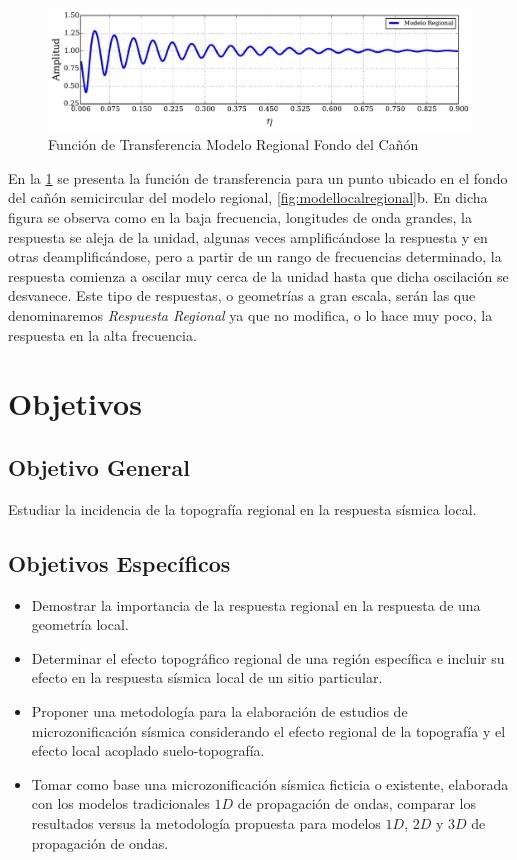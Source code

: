 \documentclass[spanish,letterpaper,12pt,twoside,openany]{article}
\begin{document}
\begin{figure}[H]
	\centering
	\includegraphics[width=15.5 cm]{img/RegionalResponse.pdf}
	\vspace{-1 cm}
	\caption{Función de Transferencia Modelo Regional Fondo del Cañón}
	\label{fig:regionalresponse}
	\vspace{-1 cm}
\end{figure}

En la \cref{fig:regionalresponse} se presenta la función de transferencia para un punto ubicado en el fondo del cañón semicircular del modelo regional, \cref{fig:modellocalregional}b. En dicha figura se observa como en la baja frecuencia, longitudes de onda grandes, la respuesta se aleja de la unidad, algunas veces amplificándose la respuesta y en otras deamplificándose, pero a partir de un rango de frecuencias determinado, la respuesta comienza a oscilar muy cerca de la unidad hasta que dicha oscilación se desvanece. Este tipo de respuestas, o geometrías a gran escala, serán las que denominaremos \textit{Respuesta Regional} ya que no modifica, o lo hace muy poco, la respuesta en la alta frecuencia.
%
%
%
%
%
\newpage
%
\section{Objetivos}
%
\subsection{Objetivo General}
%
Estudiar la incidencia de la topografía regional en la respuesta sísmica local.
%
\subsection{Objetivos Específicos}
%
\begin{itemize}
%
	\item Demostrar la importancia de la respuesta regional en la respuesta de una geometría local.
	\item Determinar el efecto topográfico regional de una región específica e incluir su efecto en la respuesta sísmica local de un sitio particular.
	\item Proponer una metodología para la elaboración de estudios de microzonificación sísmica considerando el efecto regional de la topografía y el efecto local acoplado suelo-topografía.
	\item Tomar como base una microzonificación sísmica ficticia o existente, elaborada con los modelos tradicionales $1D$ de propagación de ondas, comparar los resultados versus la metodología propuesta para modelos $1D$, $2D$ y $3D$ de propagación de ondas.
%
\end{itemize}
%
%
%
%
%
\newpage
%
\end{document}
